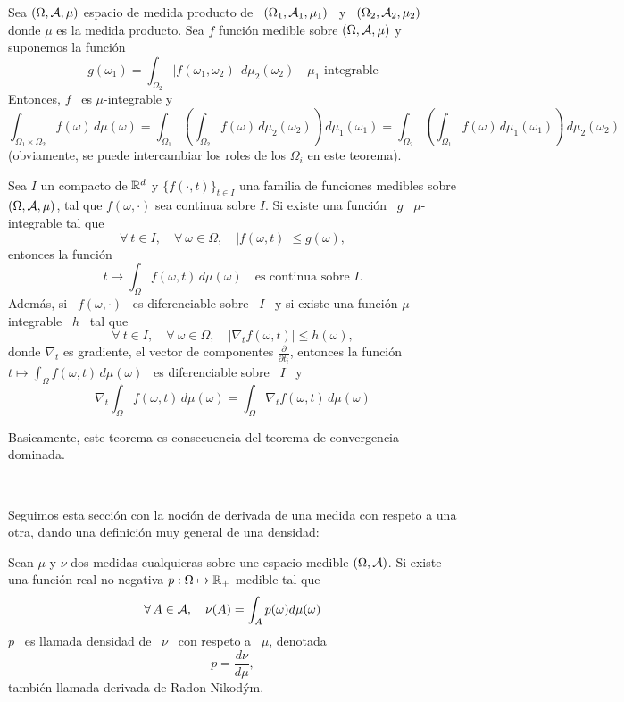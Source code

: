 {\begin{teorema}\label{Th:MP:Fubini}
  Sea  $(\Omega,\mathcal{A},\mu)$  espacio de  medida  producto  de  \ $(\Omega_1,  \mathcal{A}_1,
  \mu_1)$ \  y \ $(\Omega_2,  \mathcal{A}_2, \mu_2)$ donde  $\mu$ es la  medida producto.
  Sea $f$ funci\'on medible sobre $(\Omega,\mathcal{A},\mu)$ y suponemos la funci\'on
  \[
  g(\omega_1)   =  \int_{\Omega_2}   \left|   f(\omega_1,\omega_2)  \right|   \,
  d\mu_2(\omega_2) \quad \mu_1\mbox{-integrable}
  \]
  Entonces, $f$ \ es $\mu$-integrable y
  \[
  \int_{\Omega_1  \times \Omega_2}  f(\omega) \,  d\mu(\omega)  = \int_{\Omega_1}
  \left(    \int_{\Omega_2}   f(\omega)    \,   d\mu_2(\omega_2)    \right)   \,
  d\mu_1(\omega_1)   =  \int_{\Omega_2}   \left(  \int_{\Omega_1}   f(\omega)  \,
    d\mu_1(\omega_1) \right) \, d\mu_2(\omega_2)
  \]
  (obviamente, se puede intercambiar los roles de los $\Omega_i$ en este teorema).
\end{teorema}
%
\begin{teorema}
  Sea $I$ un compacto de $\mathbb{R}^d$ y $\{ f(\cdot,t) \}_{t \in I}$ una familia de
  funciones  medibles  sobre $(\Omega,\mathcal{A},\mu)$,  tal  que $f(\omega,\cdot)$  sea
  continua sobre $I$. Si existe una funci\'on \ $g$ \ $\mu$-integrable tal que
  \[
  \forall \:  t \in I, \quad  \forall \: \omega \in  \Omega, \quad |f(\omega,t)|
  \le g(\omega),
  \]
  entonces la funci\'on
  \[
  t  \mapsto \int_\Omega  f(\omega,t)  \, d\mu(\omega)  \quad \mbox{es  continua
    sobre \ } I.
  \]
  Adem\'as, si \ $f(\omega,\cdot)$ \ es  diferenciable sobre \ $I$ \ y si existe
  una funci\'on $\mu$-integrable \ $h$ \ tal que
  \[
  \forall \: t \in I, \quad  \forall \: \omega \in \Omega, \quad \left| \nabla_t
    f(\omega,t) \right| \le h(\omega),
  \]
  donde   $\nabla_t$    es   gradiente,    \ie   el   vector    de   componentes
  $\frac{\partial}{\partial  t_i}$,  entonces la  funci\'on  \ $\displaystyle  t
  \mapsto \int_\Omega  f(\omega,t) \, d\mu(\omega)$  \ es diferenciable  sobre \
  $I$ \ y
  \[
  \nabla_t  \int_\Omega  f(\omega,t)  \,  d\mu(\omega)  =  \int_\Omega  \nabla_t
  f(\omega,t) \, d\mu(\omega)
  \]
\end{teorema}
%
Basicamente, este teorema es  consecuencia del teorema de convergencia dominada.
}

\

Seguimos esta secci\'on con la noci\'on  de derivada de una medida con respeto a
una otra, dando una definici\'on muy general de una densidad:
%
\begin{definicion}\label{def:MP:DensidadMedida}
  Sean  $\mu$  y  $\nu$  dos  medidas  cualquieras  sobre  une  espacio  medible
  $(\Omega,\mathcal{A})$.  Si  existe una funci\'on  real no negativa $p:  \Omega \mapsto
  \mathbb{R}_+$ medible tal que
  \[
  \forall \, A \in \mathcal{A}, \quad \nu(A) = \int_A p(\omega) d\mu(\omega)
  \]
  $p$ \ es llamada densidad de \ $\nu$ \ con respeto a \ $\mu$, denotada
  \[
  p = \frac{d\nu}{d\mu},
  \]
  tambi\'en llamada derivada de Radon-Nikod\'ym.
\end{definicion}

